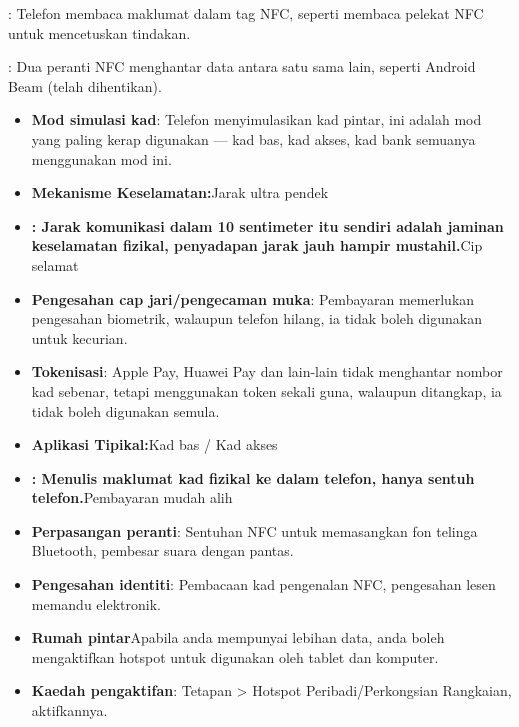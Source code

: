 
: Telefon membaca maklumat dalam tag NFC, seperti membaca pelekat NFC untuk mencetuskan tindakan.


: Dua peranti NFC menghantar data antara satu sama lain, seperti Android Beam (telah dihentikan).

\begin{itemize}
  \item \textbf{Mod simulasi kad}: Telefon menyimulasikan kad pintar, ini adalah mod yang paling kerap digunakan — kad bas, kad akses, kad bank semuanya menggunakan mod ini.
  \item \textbf{Mekanisme Keselamatan:}Jarak ultra pendek
  \item \textbf{: Jarak komunikasi dalam 10 sentimeter itu sendiri adalah jaminan keselamatan fizikal, penyadapan jarak jauh hampir mustahil.}Cip selamat
\end{itemize}


\begin{itemize}
  \item \textbf{Pengesahan cap jari/pengecaman muka}: Pembayaran memerlukan pengesahan biometrik, walaupun telefon hilang, ia tidak boleh digunakan untuk kecurian.
  \item \textbf{Tokenisasi}: Apple Pay, Huawei Pay dan lain-lain tidak menghantar nombor kad sebenar, tetapi menggunakan token sekali guna, walaupun ditangkap, ia tidak boleh digunakan semula.
  \item \textbf{Aplikasi Tipikal:}Kad bas / Kad akses
  \item \textbf{: Menulis maklumat kad fizikal ke dalam telefon, hanya sentuh telefon.}Pembayaran mudah alih
\end{itemize}


\begin{itemize}
  \item \textbf{Perpasangan peranti}: Sentuhan NFC untuk memasangkan fon telinga Bluetooth, pembesar suara dengan pantas.
  \item \textbf{Pengesahan identiti}: Pembacaan kad pengenalan NFC, pengesahan lesen memandu elektronik.
  \item \textbf{Rumah pintar}Apabila anda mempunyai lebihan data, anda boleh mengaktifkan hotspot untuk digunakan oleh tablet dan komputer.
  \item \textbf{Kaedah pengaktifan}: Tetapan > Hotspot Peribadi/Perkongsian Rangkaian, aktifkannya.
\end{itemize}

